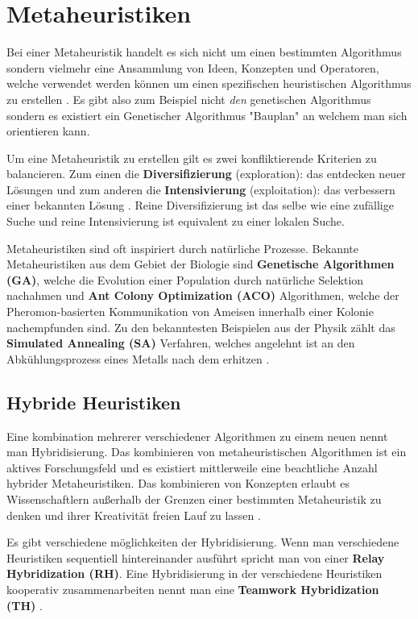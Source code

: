 \section{Metaheuristiken}
Bei einer Metaheuristik handelt es sich nicht um einen bestimmten Algorithmus sondern vielmehr eine Ansammlung von Ideen, Konzepten und Operatoren, welche verwendet werden können um einen spezifischen heuristischen Algorithmus zu erstellen \cite*{MetaheuristicsExposed}. Es gibt also zum Beispiel nicht \textit{den} genetischen Algorithmus sondern es existiert ein Genetischer Algorithmus "Bauplan" an welchem man sich orientieren kann.

Um eine Metaheuristik zu erstellen gilt es zwei konfliktierende Kriterien zu balancieren. Zum einen die \textbf{Diversifizierung} (exploration): das entdecken neuer Lösungen und zum anderen die \textbf{Intensivierung} (exploitation): das verbessern einer bekannten Lösung \cite*{MetaheuristicsEGT}. Reine Diversifizierung ist das selbe wie eine zufällige Suche und reine Intensivierung ist equivalent zu einer lokalen Suche.

Metaheuristiken sind oft inspiriert durch natürliche Prozesse. Bekannte Metaheuristiken aus dem Gebiet der Biologie sind \textbf{Genetische Algorithmen (GA)}, welche die Evolution einer Population durch natürliche Selektion nachahmen und \textbf{Ant Colony Optimization (ACO)} Algorithmen, welche der Pheromon-basierten Kommunikation von Ameisen innerhalb einer Kolonie nachempfunden sind. Zu den bekanntesten Beispielen aus der Physik zählt das \textbf{Simulated Annealing (SA)} Verfahren, welches angelehnt ist an den Abkühlungsprozess eines Metalls nach dem erhitzen \cite*{metaheuristics}.

\subsection*{Hybride Heuristiken}
Eine kombination mehrerer verschiedener Algorithmen zu einem neuen nennt man Hybridisierung. Das kombinieren von metaheuristischen Algorithmen ist ein aktives Forschungsfeld und es existiert mittlerweile eine beachtliche Anzahl hybrider Metaheuristiken. Das kombinieren von Konzepten erlaubt es Wissenschaftlern außerhalb der Grenzen einer bestimmten Metaheuristik zu denken und ihrer Kreativität freien Lauf zu lassen \cite*{MetaheuristicsSurvey}.

Es gibt verschiedene möglichkeiten der Hybridisierung. Wenn man verschiedene Heuristiken sequentiell hintereinander ausführt spricht man von einer \textbf{Relay Hybridization (RH)}. Eine Hybridisierung in der verschiedene Heuristiken kooperativ zusammenarbeiten nennt man eine \textbf{Teamwork Hybridization (TH)} \cite*{MetaheuristicsEGT}. 

